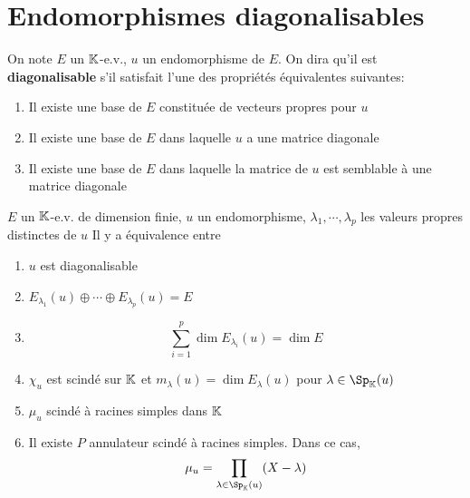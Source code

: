 \section{Endomorphismes diagonalisables}

\begin{defprop}
    On note $E$ un $\mathbb K$-e.v., $u$ un endomorphisme de $E$. On dira qu'il est \textbf{diagonalisable} s'il satisfait l'une des propriétés équivalentes suivantes: \begin{enumerate}
        \item Il existe une base de $E$ constituée de vecteurs propres pour $u$
        \item Il existe une base de $E$ dans laquelle $u$ a une matrice diagonale
        \item Il existe une base de $E$ dans laquelle la matrice de $u$ est semblable à une matrice diagonale
    \end{enumerate}
\end{defprop}

\begin{thm}
    \Hyp $E$ un $\mathbb K$-e.v. de dimension finie, $u$ un endomorphisme, $\lambda_1, \cdots, \lambda_p$ les valeurs propres distinctes de $u$
    \Conc Il y a équivalence entre \begin{enumerate}[leftmargin=2cm,label=(\alph{enumi})]
        \item $u$ est diagonalisable
        \item $E_{\lambda_1}(u)\oplus \cdots \oplus E_{\lambda_p}(u)=E$
        \item \[
                \sum_{i=1}^p\dim E_{\lambda_i}(u)=\dim E
            \]
        \item $\chi_u$ est scindé sur $\mathbb K$ et $m_{\lambda}(u)=\dim E_{\lambda}(u)$ pour $\lambda\in\Sp_{\K}(u)$
        \item $\mu_u$ scindé à racines simples dans $\mathbb K$
        \item Il existe $P$ annulateur scindé à racines simples. Dans ce cas, \[
                \mu_u=\prod_{\lambda\in\Sp_{\K}(u)}(X-\lambda)
            \]
    \end{enumerate}
\end{thm}

